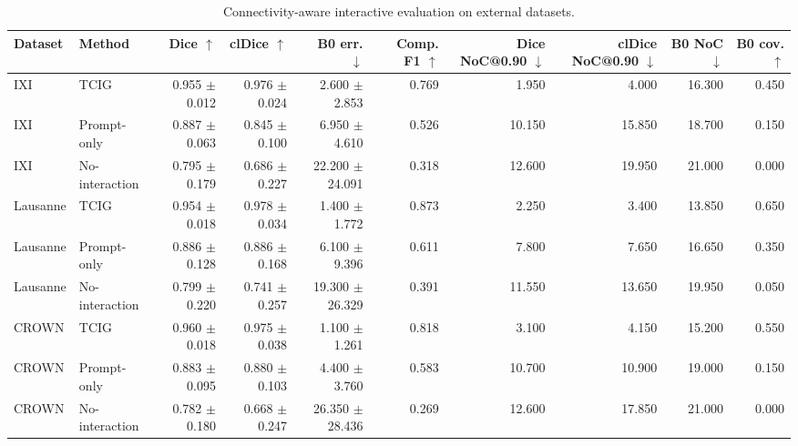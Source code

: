 \begin{table}[t]
\centering
\small
\begin{tabular}{llrrrrrrrr}
\toprule
Dataset & Method & Dice $\uparrow$ & clDice $\uparrow$ & B0 err. $\downarrow$ & Comp. F1 $\uparrow$ & Dice NoC@0.90 $\downarrow$ & clDice NoC@0.90 $\downarrow$ & B0 NoC $\downarrow$ & B0 cov. $\uparrow$ \\
\midrule
IXI & TCIG & 0.955 $\pm$ 0.012 & 0.976 $\pm$ 0.024 & 2.600 $\pm$ 2.853 & 0.769 & 1.950 & 4.000 & 16.300 & 0.450 \\
IXI & Prompt-only & 0.887 $\pm$ 0.063 & 0.845 $\pm$ 0.100 & 6.950 $\pm$ 4.610 & 0.526 & 10.150 & 15.850 & 18.700 & 0.150 \\
IXI & No-interaction & 0.795 $\pm$ 0.179 & 0.686 $\pm$ 0.227 & 22.200 $\pm$ 24.091 & 0.318 & 12.600 & 19.950 & 21.000 & 0.000 \\
Lausanne & TCIG & 0.954 $\pm$ 0.018 & 0.978 $\pm$ 0.034 & 1.400 $\pm$ 1.772 & 0.873 & 2.250 & 3.400 & 13.850 & 0.650 \\
Lausanne & Prompt-only & 0.886 $\pm$ 0.128 & 0.886 $\pm$ 0.168 & 6.100 $\pm$ 9.396 & 0.611 & 7.800 & 7.650 & 16.650 & 0.350 \\
Lausanne & No-interaction & 0.799 $\pm$ 0.220 & 0.741 $\pm$ 0.257 & 19.300 $\pm$ 26.329 & 0.391 & 11.550 & 13.650 & 19.950 & 0.050 \\
CROWN & TCIG & 0.960 $\pm$ 0.018 & 0.975 $\pm$ 0.038 & 1.100 $\pm$ 1.261 & 0.818 & 3.100 & 4.150 & 15.200 & 0.550 \\
CROWN & Prompt-only & 0.883 $\pm$ 0.095 & 0.880 $\pm$ 0.103 & 4.400 $\pm$ 3.760 & 0.583 & 10.700 & 10.900 & 19.000 & 0.150 \\
CROWN & No-interaction & 0.782 $\pm$ 0.180 & 0.668 $\pm$ 0.247 & 26.350 $\pm$ 28.436 & 0.269 & 12.600 & 17.850 & 21.000 & 0.000 \\
\bottomrule
\end{tabular}
\caption{Connectivity-aware interactive evaluation on external datasets.}
\label{tab:tcig_multidataset_topology}
\end{table}
